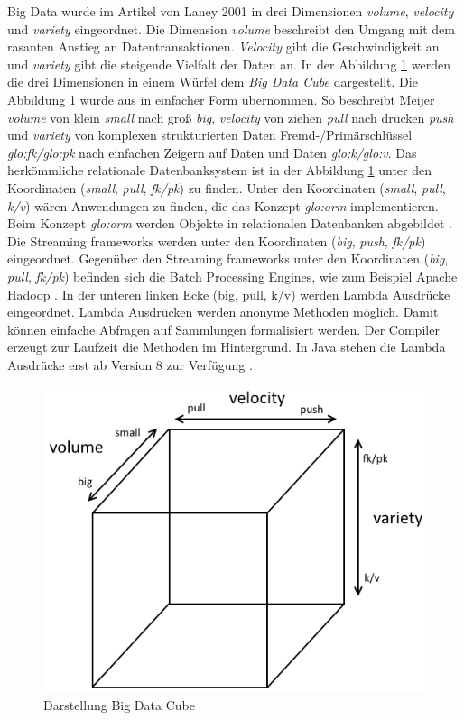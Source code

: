Big Data wurde im Artikel  von Laney 2001 in drei Dimensionen \textit{volume}, \textit{velocity} und \textit{variety} eingeordnet. Die Dimension \textit{volume} beschreibt den Umgang mit dem rasanten Anstieg an Datentransaktionen. \textit{Velocity} gibt die Geschwindigkeit an und \textit{variety} gibt die steigende Vielfalt der Daten an. In der Abbildung \ref{fig:bigdatacube} werden die drei Dimensionen in einem Würfel dem \textit{Big Data Cube} dargestellt. Die Abbildung \ref{fig:bigdatacube} wurde aus  in einfacher Form übernommen. So beschreibt Meijer \textit{volume} von klein \textit{small} nach groß \textit{big}, \textit{velocity} von ziehen \textit{pull} nach drücken \textit{push} und \textit{variety} von komplexen strukturierten Daten Fremd-/Primärschlüssel \textit{\acrshort{glo:fk}/\acrshort{glo:pk}} nach einfachen Zeigern auf Daten und Daten \textit{\acrshort{glo:k}/\acrshort{glo:v}}. Das herkömmliche relationale Datenbanksystem ist in der Abbildung \ref{fig:bigdatacube} unter den Koordinaten (\textit{small}, \textit{pull}, \textit{fk/pk}) zu finden. Unter den Koordinaten (\textit{small}, \textit{pull}, \textit{k/v}) wären Anwendungen zu finden, die das Konzept \textit{\gls{glo:orm}} implementieren. Beim Konzept \textit{\gls{glo:orm}} werden Objekte in relationalen Datenbanken abgebildet . Die Streaming frameworks werden unter den Koordinaten (\textit{big}, \textit{push}, \textit{fk/pk}) eingeordnet. Gegenüber den Streaming frameworks unter den Koordinaten (\textit{big}, \textit{pull}, \textit{fk/pk}) befinden sich die Batch Processing Engines, wie zum Beispiel Apache Hadoop . In der unteren linken Ecke (big, pull, k/v) werden Lambda Ausdrücke eingeordnet. Lambda Ausdrücken werden anonyme Methoden möglich. Damit können einfache Abfragen auf Sammlungen formalisiert werden. Der Compiler erzeugt zur Laufzeit die Methoden im Hintergrund. In Java stehen die Lambda Ausdrücke erst ab Version 8 zur Verfügung .

\begin{figure}[htb!]
\centering
\includegraphics[width=1.0\textwidth]{bilder/bigdatacube.png}
\caption{Darstellung Big Data Cube
\label{fig:bigdatacube}}
\end{figure}

